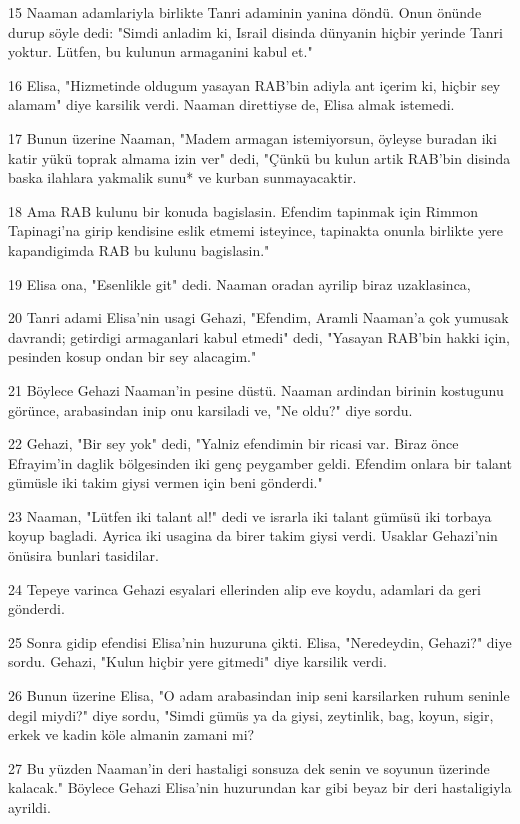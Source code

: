 \par 15 Naaman adamlariyla birlikte Tanri adaminin yanina döndü. Onun önünde durup söyle dedi: "Simdi anladim ki, Israil disinda dünyanin hiçbir yerinde Tanri yoktur. Lütfen, bu kulunun armaganini kabul et."
\par 16 Elisa, "Hizmetinde oldugum yasayan RAB'bin adiyla ant içerim ki, hiçbir sey alamam" diye karsilik verdi. Naaman direttiyse de, Elisa almak istemedi.
\par 17 Bunun üzerine Naaman, "Madem armagan istemiyorsun, öyleyse buradan iki katir yükü toprak almama izin ver" dedi, "Çünkü bu kulun artik RAB'bin disinda baska ilahlara yakmalik sunu* ve kurban sunmayacaktir.
\par 18 Ama RAB kulunu bir konuda bagislasin. Efendim tapinmak için Rimmon Tapinagi'na girip kendisine eslik etmemi isteyince, tapinakta onunla birlikte yere kapandigimda RAB bu kulunu bagislasin."
\par 19 Elisa ona, "Esenlikle git" dedi. Naaman oradan ayrilip biraz uzaklasinca,
\par 20 Tanri adami Elisa'nin usagi Gehazi, "Efendim, Aramli Naaman'a çok yumusak davrandi; getirdigi armaganlari kabul etmedi" dedi, "Yasayan RAB'bin hakki için, pesinden kosup ondan bir sey alacagim."
\par 21 Böylece Gehazi Naaman'in pesine düstü. Naaman ardindan birinin kostugunu görünce, arabasindan inip onu karsiladi ve, "Ne oldu?" diye sordu.
\par 22 Gehazi, "Bir sey yok" dedi, "Yalniz efendimin bir ricasi var. Biraz önce Efrayim'in daglik bölgesinden iki genç peygamber geldi. Efendim onlara bir talant gümüsle iki takim giysi vermen için beni gönderdi."
\par 23 Naaman, "Lütfen iki talant al!" dedi ve israrla iki talant gümüsü iki torbaya koyup bagladi. Ayrica iki usagina da birer takim giysi verdi. Usaklar Gehazi'nin önüsira bunlari tasidilar.
\par 24 Tepeye varinca Gehazi esyalari ellerinden alip eve koydu, adamlari da geri gönderdi.
\par 25 Sonra gidip efendisi Elisa'nin huzuruna çikti. Elisa, "Neredeydin, Gehazi?" diye sordu. Gehazi, "Kulun hiçbir yere gitmedi" diye karsilik verdi.
\par 26 Bunun üzerine Elisa, "O adam arabasindan inip seni karsilarken ruhum seninle degil miydi?" diye sordu, "Simdi gümüs ya da giysi, zeytinlik, bag, koyun, sigir, erkek ve kadin köle almanin zamani mi?
\par 27 Bu yüzden Naaman'in deri hastaligi sonsuza dek senin ve soyunun üzerinde kalacak." Böylece Gehazi Elisa'nin huzurundan kar gibi beyaz bir deri hastaligiyla ayrildi.

